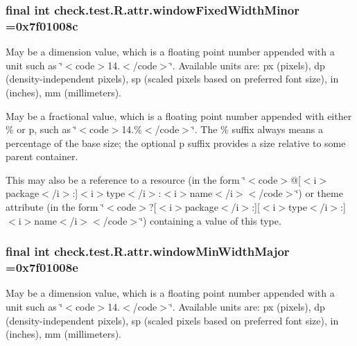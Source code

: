 \subsubsection[{window\+Fixed\+Width\+Minor}]{\setlength{\rightskip}{0pt plus 5cm}final int check.\+test.\+R.\+attr.\+window\+Fixed\+Width\+Minor =0x7f01008c\hspace{0.3cm}{\ttfamily [static]}}\label{classcheck_1_1test_1_1_r_1_1attr_a7a67f15de710341d2d449dc94d1f781d}
May be a dimension value, which is a floating point number appended with a unit such as \char`\"{}$<$code$>$14.\+5sp$<$/code$>$\char`\"{}. Available units are\+: px (pixels), dp (density-\/independent pixels), sp (scaled pixels based on preferred font size), in (inches), mm (millimeters). 

May be a fractional value, which is a floating point number appended with either \% or p, such as \char`\"{}$<$code$>$14.\%$<$/code$>$\char`\"{}. The \% suffix always means a percentage of the base size; the optional p suffix provides a size relative to some parent container. 

This may also be a reference to a resource (in the form \char`\"{}$<$code$>$@\mbox{[}$<$i$>$package$<$/i$>$\+:\mbox{]}$<$i$>$type$<$/i$>$\+:$<$i$>$name$<$/i$>$$<$/code$>$\char`\"{}) or theme attribute (in the form \char`\"{}$<$code$>$?\mbox{[}$<$i$>$package$<$/i$>$\+:\mbox{]}\mbox{[}$<$i$>$type$<$/i$>$\+:\mbox{]}$<$i$>$name$<$/i$>$$<$/code$>$\char`\"{}) containing a value of this type. \hypertarget{classcheck_1_1test_1_1_r_1_1attr_ad36e3ab0bb3027c715b3ab1e256f0def}{}
\subsubsection[{window\+Min\+Width\+Major}]{\setlength{\rightskip}{0pt plus 5cm}final int check.\+test.\+R.\+attr.\+window\+Min\+Width\+Major =0x7f01008e\hspace{0.3cm}{\ttfamily [static]}}\label{classcheck_1_1test_1_1_r_1_1attr_ad36e3ab0bb3027c715b3ab1e256f0def}
May be a dimension value, which is a floating point number appended with a unit such as \char`\"{}$<$code$>$14.\+5sp$<$/code$>$\char`\"{}. Available units are\+: px (pixels), dp (density-\/independent pixels), sp (scaled pixels based on preferred font size), in (inches), mm (millimeters). 

